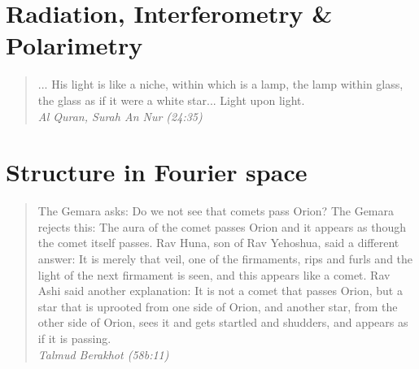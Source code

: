 \documentclass[12pt,twoside,openany]{book}
\newcommand{\singlespaced}{\renewcommand{\baselinestretch}{1}\normalfont}
\newcommand{\halfspaced}{\renewcommand{\baselinestretch}{1.5}\normalfont}
\begin{document}
\vspace*{\fill}

\newpage

\singlespaced
\tableofcontents

\newpage
{}
{}
\listoftables

\newpage
{}
\listoffigures


\halfspaced
\setlength{\parindent}{0.25in}



\mainmatter
\part{Radiation, Interferometry \& Polarimetry}

\vspace*{\fill} 
\begin{quote} 
\centering 
... His light is like a niche, within which is a lamp, the lamp within glass, the glass as if it were a white star... Light upon light.\\
\textit{Al Quran, Surah An Nur (24:35)}
\end{quote}
\vspace*{\fill}

%
%
%
%
%

%
%
%

%
%
\part{Structure in Fourier space}

\vspace*{\fill} 
\begin{quote} 
\centering 
The Gemara asks: Do we not see that comets pass Orion? The Gemara rejects this: The aura of the comet passes Orion and it appears as though the comet itself passes. Rav Huna, son of Rav Yehoshua, said a different answer: It is merely that veil, one of the firmaments, rips and furls and the light of the next firmament is seen, and this appears like a comet. Rav Ashi said another explanation: It is not a comet that passes Orion, but a star that is uprooted from one side of Orion, and another star, from the other side of Orion, sees it and gets startled and shudders, and appears as if it is passing.\\

\textit{Talmud Berakhot (58b:11)}
\end{quote}
\vspace*{\fill}
\end{document}
